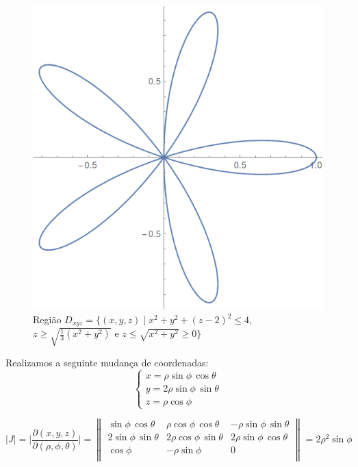 \documentclass[12pt,a4paper]{article}
\begin{document}
\begin{figure}[h!]
	\centering
	\includegraphics[scale=0.3]{Fig1.png}  
	\caption{Regi\~{a}o $ D_{xyz} = \lbrace(x, y, z)\mid x^2 + y^2 + (z-2)^2 \leq 4 $, $z \geq \sqrt{\frac{1}{3}(x^2 + y^2)} $ e $ z \leq \sqrt{x^2 + y^2} \geq 0 \rbrace $}
	\label{fig:figura1}
\end{figure}

Realizamos a seguinte mudança de coordenadas:
\begin{equation}
\left\{\begin{array}{ll}
x=\rho\sin\phi\,\cos\theta\\
y= 2\rho\sin\phi\,\sin\theta\\
z = \rho\cos\phi
\end{array}\right.
\label{eq:Q1_mudanca}
\end{equation}

\begin{equation}
|J| = \Big| \frac{\partial (x,y,z) }{\partial (\rho,\phi,\theta)} \Big| = \begin{Vmatrix}
\sin\phi\,\cos\theta &  \rho\cos\phi\,\cos\theta & -\rho\sin\phi\,\sin\theta \\
2\sin\phi\,\sin\theta & 2\rho\cos\phi\,\sin\theta & 2\rho\sin\phi\,\cos\theta \\
\cos\phi & -\rho\sin\phi & 0 \\
\end{Vmatrix} = 2\rho^2\sin\phi
\label{eq:Q1_Jac}
\end{equation}
\end{document}
